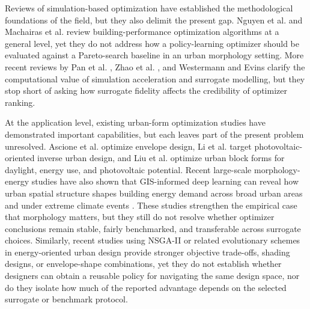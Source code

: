 \documentclass[final,3p,times]{elsarticle}
\begin{document}
Reviews of simulation-based optimization have established the methodological foundations of the field, but they also delimit the present gap. Nguyen et al. \cite{ref14} and Machairas et al. \cite{ref15} review building-performance optimization algorithms at a general level, yet they do not address how a policy-learning optimizer should be evaluated against a Pareto-search baseline in an urban morphology setting. More recent reviews by Pan et al. \cite{ref18}, Zhao et al. \cite{ref19}, and Westermann and Evins \cite{ref20} clarify the computational value of simulation acceleration and surrogate modelling, but they stop short of asking how surrogate fidelity affects the credibility of optimizer ranking.

At the application level, existing urban-form optimization studies have demonstrated important capabilities, but each leaves part of the present problem unresolved. Ascione et al. \cite{ref11} optimize envelope design, Li et al. \cite{ref12} target photovoltaic-oriented inverse urban design, and Liu et al. \cite{ref13} optimize urban block forms for daylight, energy use, and photovoltaic potential. Recent large-scale morphology-energy studies have also shown that GIS-informed deep learning can reveal how urban spatial structure shapes building energy demand across broad urban areas and under extreme climate events \cite{ref41,ref42,ref43}. These studies strengthen the empirical case that morphology matters, but they still do not resolve whether optimizer conclusions remain stable, fairly benchmarked, and transferable across surrogate choices. Similarly, recent studies using NSGA-II or related evolutionary schemes in energy-oriented urban design \cite{ref16,ref17,ref22,ref23,ref24,ref25} provide stronger objective trade-offs, shading designs, or envelope-shape combinations, yet they do not establish whether designers can obtain a reusable policy for navigating the same design space, nor do they isolate how much of the reported advantage depends on the selected surrogate or benchmark protocol.
\end{document}
